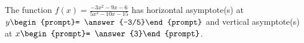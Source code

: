 \documentclass{ximera}
\author{Gregory Hartman \and Matthew Carr}
\begin{document}
\begin{exercise}





The function $f(x)=\frac{-3x^2-9x-6}{5x^2-10x-15}$ has horizontal asymptote(s) at $y\begin{prompt}= \answer{-3/5}\end{prompt}$ and vertical asymptote(s) at $x\begin{prompt}= \answer{3}\end{prompt}$.

\end{exercise}
\end{document}
